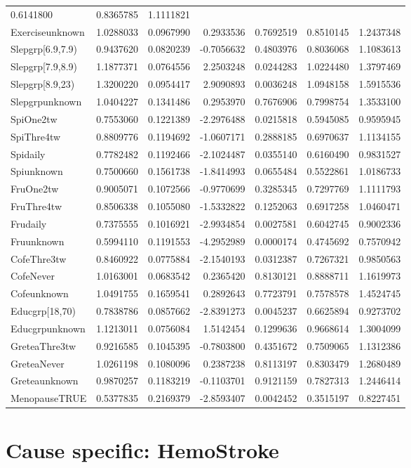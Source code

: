 \documentclass[]{article}
\begin{document}
\begin{longtable}[]{@{}lrrrrrr@{}}
0.6141800 & 0.8365785 & 1.1111821\tabularnewline
Exerciseunknown & 1.0288033 & 0.0967990 & 0.2933536 & 0.7692519 &
0.8510145 & 1.2437348\tabularnewline
Slepgrp{[}6.9,7.9) & 0.9437620 & 0.0820239 & -0.7056632 & 0.4803976 &
0.8036068 & 1.1083613\tabularnewline
Slepgrp{[}7.9,8.9) & 1.1877371 & 0.0764556 & 2.2503248 & 0.0244283 &
1.0224480 & 1.3797469\tabularnewline
Slepgrp{[}8.9,23) & 1.3200220 & 0.0954417 & 2.9090893 & 0.0036248 &
1.0948158 & 1.5915536\tabularnewline
Slepgrpunknown & 1.0404227 & 0.1341486 & 0.2953970 & 0.7676906 &
0.7998754 & 1.3533100\tabularnewline
SpiOne2tw & 0.7553060 & 0.1221389 & -2.2976488 & 0.0215818 & 0.5945085 &
0.9595945\tabularnewline
SpiThre4tw & 0.8809776 & 0.1194692 & -1.0607171 & 0.2888185 & 0.6970637
& 1.1134155\tabularnewline
Spidaily & 0.7782482 & 0.1192466 & -2.1024487 & 0.0355140 & 0.6160490 &
0.9831527\tabularnewline
Spiunknown & 0.7500660 & 0.1561738 & -1.8414993 & 0.0655484 & 0.5522861
& 1.0186733\tabularnewline
FruOne2tw & 0.9005071 & 0.1072566 & -0.9770699 & 0.3285345 & 0.7297769 &
1.1111793\tabularnewline
FruThre4tw & 0.8506338 & 0.1055080 & -1.5332822 & 0.1252063 & 0.6917258
& 1.0460471\tabularnewline
Frudaily & 0.7375555 & 0.1016921 & -2.9934854 & 0.0027581 & 0.6042745 &
0.9002336\tabularnewline
Fruunknown & 0.5994110 & 0.1191553 & -4.2952989 & 0.0000174 & 0.4745692
& 0.7570942\tabularnewline
CofeThre3tw & 0.8460922 & 0.0775884 & -2.1540193 & 0.0312387 & 0.7267321
& 0.9850563\tabularnewline
CofeNever & 1.0163001 & 0.0683542 & 0.2365420 & 0.8130121 & 0.8888711 &
1.1619973\tabularnewline
Cofeunknown & 1.0491755 & 0.1659541 & 0.2892643 & 0.7723791 & 0.7578578
& 1.4524745\tabularnewline
Educgrp{[}18,70) & 0.7838786 & 0.0857662 & -2.8391273 & 0.0045237 &
0.6625894 & 0.9273702\tabularnewline
Educgrpunknown & 1.1213011 & 0.0756084 & 1.5142454 & 0.1299636 &
0.9668614 & 1.3004099\tabularnewline
GreteaThre3tw & 0.9216585 & 0.1045395 & -0.7803800 & 0.4351672 &
0.7509065 & 1.1312386\tabularnewline
GreteaNever & 1.0261198 & 0.1080096 & 0.2387238 & 0.8113197 & 0.8303479
& 1.2680489\tabularnewline
Greteaunknown & 0.9870257 & 0.1183219 & -0.1103701 & 0.9121159 &
0.7827313 & 1.2446414\tabularnewline
MenopauseTRUE & 0.5377835 & 0.2169379 & -2.8593407 & 0.0042452 &
0.3515197 & 0.8227451\tabularnewline
\bottomrule
\end{longtable}

\hypertarget{cause-specific-hemostroke}{%
\section{Cause specific: HemoStroke}\label{cause-specific-hemostroke}}
\end{document}
